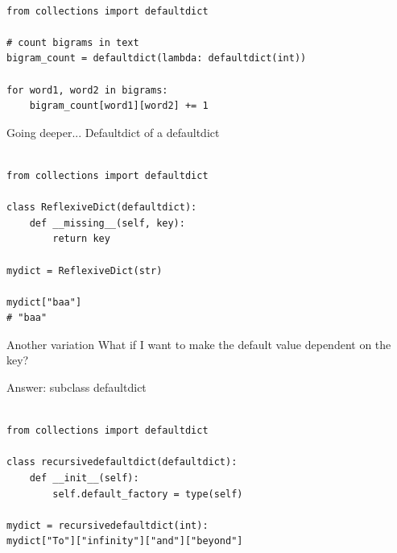 \documentclass{beamer}
\begin{document}
\begin{lrbox}{\mysavebox}
\begin{lstlisting}

from collections import defaultdict

# count bigrams in text
bigram_count = defaultdict(lambda: defaultdict(int))

for word1, word2 in bigrams:
	bigram_count[word1][word2] += 1

\end{lstlisting}
\end{lrbox}

\begin{frame}{Going deeper...}
 Defaultdict of a defaultdict

\vspace{1.5em}
{\usebox{\mysavebox}}
   
\end{frame}



\begin{lrbox}{\mysavebox}
\begin{lstlisting}

from collections import defaultdict

class ReflexiveDict(defaultdict):
    def __missing__(self, key):
        return key

mydict = ReflexiveDict(str)

mydict["baa"]
# "baa"

\end{lstlisting}
\end{lrbox}

\begin{frame}{Another variation}
 What if I want to make the default value dependent on the key?

 \bigskip

 Answer: subclass defaultdict
 
\vspace{1em}
{\usebox{\mysavebox}}
    
\end{frame}

\begin{lrbox}{\mysavebox}
\begin{lstlisting}

from collections import defaultdict

class recursivedefaultdict(defaultdict):
    def __init__(self):
        self.default_factory = type(self)

mydict = recursivedefaultdict(int):
mydict["To"]["infinity"]["and"]["beyond"]

\end{lstlisting}
\end{lrbox}
\end{document}

